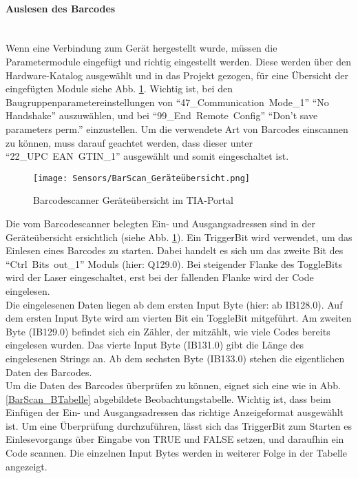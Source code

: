 \paragraph{Auslesen des Barcodes}\mbox{}\\
Wenn eine Verbindung zum Gerät hergestellt wurde, müssen die Parametermodule eingefügt und richtig eingestellt werden. Diese werden über den Hardware-Katalog ausgewählt und in das Projekt gezogen, für eine Übersicht der eingefügten Module siehe Abb. \ref{BarScan_TIA}. Wichtig ist, bei den Baugruppenparametereinstellungen von \enquote{\mbox{47\_Communication Mode\_1}} \enquote{No Handshake} auszuwählen, und bei \enquote{\mbox{99\_End Remote Config}}
\enquote{Don't save parameters perm.} einzustellen. Um die verwendete Art von Barcodes einscannen zu können, muss darauf geachtet werden, dass dieser unter \enquote{\mbox{22\_UPC EAN GTIN\_1}} ausgewählt und somit eingeschaltet ist.\\

\begin{figure}[H]
    \centering
    \texttt{[image: Sensors/BarScan\_Geräteübersicht.png]}
    \caption{Barcodescanner Geräteübersicht im TIA-Portal}
    \label{BarScan_TIA}
\end{figure}

Die vom Barcodescanner belegten Ein- und Ausgangsadressen sind in der Geräteübersicht ersichtlich (siehe Abb. \ref{BarScan_TIA}). Ein TriggerBit wird verwendet, um das Einlesen eines Barcodes zu starten. Dabei handelt es sich um das zweite Bit des \enquote{\mbox{Ctrl Bits out\_1}} Moduls (hier: Q129.0). Bei steigender Flanke des ToggleBits wird der Laser eingeschaltet, erst bei der fallenden Flanke wird der Code eingelesen.\\
Die eingelesenen Daten liegen ab dem ersten Input Byte (hier: ab IB128.0). Auf dem ersten Input Byte wird am vierten Bit ein ToggleBit mitgeführt. Am zweiten Byte (IB129.0) befindet sich ein Zähler, der mitzählt, wie viele Codes bereits eingelesen wurden. Das vierte Input Byte (IB131.0) gibt die Länge des eingelesenen Strings an. Ab dem sechsten Byte (IB133.0) stehen die eigentlichen Daten des Barcodes.\\
Um die Daten des Barcodes überprüfen zu können, eignet sich eine wie in Abb. \ref{BarScan_BTabelle} abgebildete Beobachtungstabelle. Wichtig ist, dass beim Einfügen der Ein- und Ausgangsadressen das richtige Anzeigeformat ausgewählt ist. Um eine Überprüfung durchzuführen, lässt sich das TriggerBit zum Starten es Einlesevorgangs über Eingabe von TRUE und FALSE setzen, und daraufhin ein Code scannen. Die einzelnen Input Bytes werden in weiterer Folge in der Tabelle angezeigt.

